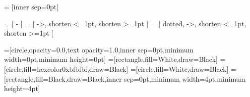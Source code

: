 
\usepackage{tikz}
\usepackage{pgfplots}



\tikzset{>=latex}
   = [inner sep=0pt]

  = [ - ]
  = [ ->, shorten <=1pt, shorten >=1pt ]
 = [ dotted, ->, shorten <=1pt, shorten >=1pt ]

=[circle,opacity=0.0,text opacity=1.0,inner sep=0pt,minimum
width=0pt,minimum height=0pt]
=[rectangle,fill=White,draw=Black]
=[circle,fill=hexcolor0xbfbfbf,draw=Black]
=[circle,fill=White,draw=Black]
=[rectangle,fill=Black,draw=Black,inner sep=0pt,minimum width=4pt,minimum height=4pt]
